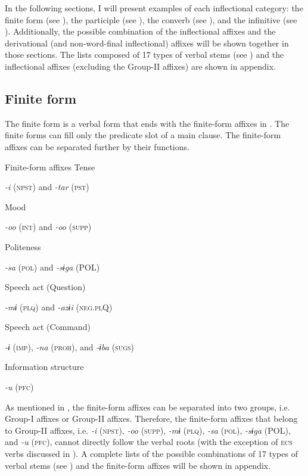 In the following sections, I will present examples of each inflectional category: the finite form (see ), the participle (see ), the converb (see ), and the infinitive (see ). Additionally, the possible combination of the inflectional affixes and the derivational (and non-word-final inflectional) affixes will be shown together in those sections. The lists composed of 17 types of verbal stems (see ) and the inflectional affixes (excluding the Group-II affixes) are shown in appendix.

\subsection{Finite form}

The finite form is a verbal form that ends with the finite-form affixes in . The finite forms can fill only the predicate slot of a main clause. The finite-form affixes can be separated further by their functions.

\ea\label{ex:8-52}
  Finite-form affixes
\ea Tense

    \textit{-i} (\textsc{npst}) and \textit{-tar} (\textsc{pst})

\ex Mood

    \textit{-oo} (\textsc{int}) and \textit{-oo} (\textsc{supp})

\ex Politeness

    \textit{-sa} (\textsc{pol}) and \textit{-sɨga} (POL)

\ex Speech act (Question)

    \textit{-mɨ} (\textsc{plq}) and \textit{-azɨi} (\textsc{neg}.\textsc{pl}Q)

\ex Speech act (Command)

    \textit{-ɨ} (\textsc{imp}), \textit{-na} (\textsc{proh}), and \textit{-ɨba} (\textsc{sugs})

\ex Information structure

    \textit{-u} (\textsc{pfc})
\z
\z

As mentioned in , the finite-form affixes can be separated into two groups, i.e. Group-I affixes or Group-II affixes. Therefore, the finite-form affixes that belong to Group-II affixes, i.e. \textit{-i} (\textsc{npst}), \textit{-oo} (\textsc{supp}), \textit{-mɨ} (\textsc{plq}), \textit{-sa} (\textsc{pol}), \textit{-sɨga} (POL), and \textit{-u} (\textsc{pfc}), cannot directly follow the verbal roots (with the exception of \textsc{ecs} verbs discussed in ). A complete lists of the possible combinations of 17 types of verbal stems (see ) and the finite-form affixes will be shown in appendix.

